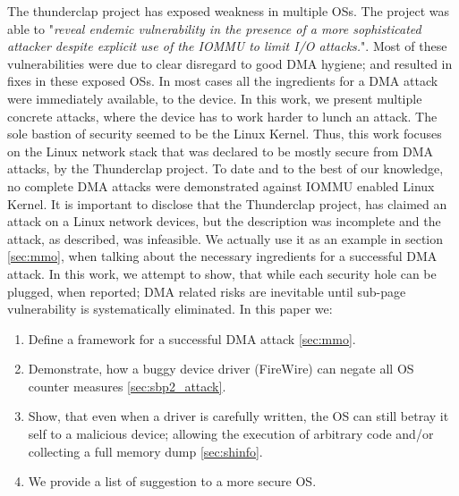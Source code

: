The thunderclap project \cite{thunder} has exposed weakness in multiple OSs. The project was able to "\emph{reveal endemic vulnerability in the presence of a more sophisticated attacker despite explicit use of the IOMMU to limit I/O attacks.}". Most of these vulnerabilities were due to clear disregard to good DMA hygiene; and resulted in fixes in these exposed OSs. In most cases all the ingredients for a DMA attack were immediately available, to the device. In this work, we present multiple concrete attacks, where the device has to work harder to lunch an attack. The sole bastion of security seemed to be the Linux Kernel. Thus, this work focuses on the Linux network stack that was declared to be mostly secure from DMA attacks, by the Thunderclap project. To date and to the best of our knowledge, no complete DMA attacks were demonstrated against IOMMU enabled Linux Kernel. It is important to disclose that the Thunderclap project, has claimed an attack on a Linux network devices, but the description was incomplete and the attack, as described, was infeasible. We actually use it as an example in section \ref{sec:mmo}, when talking about the necessary ingredients for a successful DMA attack. In this work, we attempt to show, that while each security hole can be plugged, when reported; DMA related risks are inevitable until sub-page vulnerability is systematically eliminated.
\newline
In this paper we:
\begin{enumerate}
    \item Define a framework for a successful DMA attack \ref{sec:mmo}. 
    \item Demonstrate, how a buggy device driver (FireWire) can negate all OS counter measures \ref{sec:sbp2_attack}.
    \item Show, that even when a driver is carefully written, the OS can still betray it self to a malicious device; allowing the execution of arbitrary code and/or collecting a full memory dump \ref{sec:shinfo}.
    \item We provide a list of suggestion to a more secure OS.
\end{enumerate}
 











\appendix





